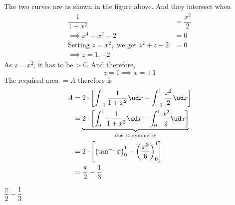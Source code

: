 \begin{solution}[\fullpage]
	The two curves are as shown in the figure above. And they intersect when
  \begin{align}
     \dfrac{1}{1+x^2} &= \dfrac{x^2}{2} \\
     \implies x^4+x^2-2 &= 0 \\
     \text{Setting } z = x^2, \text{ we get }
     z^2+z-2 &= 0 \\
     \implies z = 1, -2
  \end{align}
  As $z = x^2$, it has to be > 0. And therefore, 
	\[ z = 1 \implies x = \pm 1 \]
	The required area $=A$ therefore is 
  \begin{align}
     A &= 2\cdot\left[ \int_{-1}^1 \dfrac{1}{1+x^2}\ud x - \int_{-1}^1\dfrac{x^2}{2}\ud x\right] \\
       &= \underbrace{2\cdot\left[ \int_0^1 \dfrac{1}{1+x^2}\ud x - \int_0^1\dfrac{x^2}{2}\ud x\right]}_{\text{due to symmetry}} \\
     &= 2\cdot\left[ \left( \tan^{-1} x\right)_0^1 - \left( \dfrac{x^3}{6}\right)_0^1\right] \\
     &= \dfrac{\pi}{2} - \dfrac{1}{3} 
  \end{align}
\end{solution}
\ifprintanswers\begin{codex}$\dfrac\pi{2}-\dfrac{1}{3}$\end{codex}\fi
